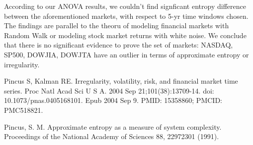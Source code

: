 \documentclass{article}[12pt]
\begin{document}
                According to our ANOVA results, we couldn't find signficant entropy difference between the aforementioned markets, with respect to 5-yr time windows chosen. The findings are parallel to the theoru of modeling financial markets with Random Walk or modeling stock market returns with white noise. We conclude that there is no significant evidence to prove the set of markets: NASDAQ, SP500, DOWJIA, DOWJTA have an outlier in terms of approximate entropy or irregularity.

                
            \begin{thebibliography}{2}
                Pincus S, Kalman RE. Irregularity, volatility, risk, and financial market time series. Proc Natl Acad Sci U S A. 2004 Sep 21;101(38):13709-14. doi: 10.1073/pnas.0405168101. Epub 2004 Sep 9. PMID: 15358860; PMCID: PMC518821.

                Pincus, S. M. Approximate entropy as a measure of system complexity. Proceedings of the National Academy of Sciences 88, 22972301 (1991).

            \end{thebibliography}
\end{document}
